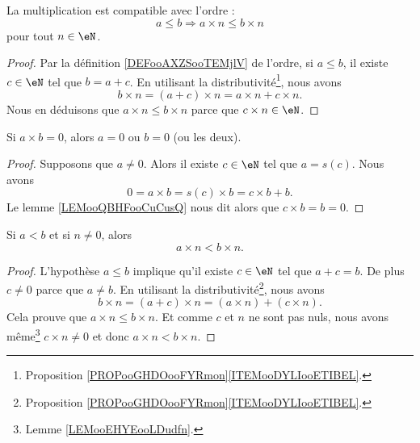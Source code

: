 \begin{lemma}
	La multiplication est compatible avec l'ordre :
	\begin{equation}
		a\leq b\Rightarrow a\times n\leq b\times n
	\end{equation}
	pour tout \( n\in \eN\).
\end{lemma}

\begin{proof}
	Par la définition \ref{DEFooAXZSooTEMjlV} de l'ordre, si \( a\leq b\), il existe \( c\in \eN\) tel que \( b=a+c\). En utilisant la distributivité\footnote{Proposition \ref{PROPooGHDOooFYRmon}\ref{ITEMooDYLIooETIBEL}.}, nous avons
	\begin{equation}
		b\times n=(a+c)\times n=a\times n+c\times n.
	\end{equation}
	Nous en déduisons que \( a\times n\leq b\times n\) parce que \( c\times n \in \eN\).
\end{proof}

\begin{lemma}       \label{LEMooEHYEooLDudfn}
	Si \( a\times b=0\), alors \( a=0\) ou \( b=0\) (ou les deux).
\end{lemma}

\begin{proof}
	Supposons que \( a\neq 0\). Alors il existe \( c\in \eN\) tel que \( a=s(c)\). Nous avons
	\begin{equation}
		0=a\times b=s(c)\times b=c\times b+b.
	\end{equation}
	Le lemme \ref{LEMooQBHFooCuCusQ} nous dit alors que \( c\times b=b=0\).
\end{proof}

\begin{lemma}        \label{LEMooGUXGooBcKJdS}
	Si \( a< b\)  et si \( n\neq 0\), alors
	\begin{equation}
		a\times n<b\times n.
	\end{equation}
\end{lemma}

\begin{proof}
	L'hypothèse \( a\leq b\) implique qu'il existe \( c\in \eN\) tel que \( a+c=b\). De plus \( c\neq 0\) parce que \( a\neq b\). En utilisant la distributivité\footnote{Proposition \ref{PROPooGHDOooFYRmon}\ref{ITEMooDYLIooETIBEL}.}, nous avons
	\begin{equation}
		b\times n=(a+c)\times n=(a\times n)+(c\times n).
	\end{equation}
	Cela prouve que \( a\times n\leq b\times n\). Et comme \( c\) et \( n\) ne sont pas nuls, nous avons même\footnote{Lemme \ref{LEMooEHYEooLDudfn}.} \( c\times n\neq 0\) et donc \( a\times n<b\times n\).
\end{proof}

